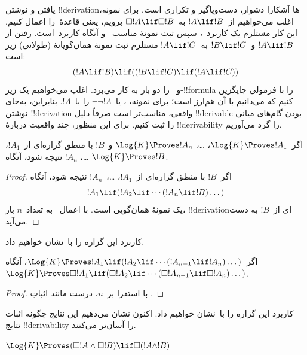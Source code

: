 \documentclass[../../../include/open-logic-section]{subfiles}
\begin{document}


یافتن و نوشتن !!{derivation}ها آشکارا دشوار، دست‌وپاگیر و تکراری است.
برای نمونه، اغلب می‌خواهیم از~$!A \lif !B$ به~$\Box !A \lif \Box !B$
برویم، یعنی قاعدهٔ~\RK را اعمال کنیم. این کار مستلزم یک کاربرد~\Nec،
سپس ثبت نمونهٔ مناسب~ و آنگاه کاربرد~\MP است. رفتن از
$!A \lif !B$ و~$!B \lif !C$ به~$!A \lif !C$ مستلزم ثبت نمونهٔ
همان‌گویانهٔ (طولانی) زیر است:
\[
(!A \lif !B) \lif ((!B \lif !C) \lif (!A \lif !C))
\]
و~\MP{} را دو بار به کار می‌برد. اغلب می‌خواهیم یک زیر-!!{formula} را
با فرمولی جایگزین کنیم که می‌دانیم با آن هم‌ارز است؛ برای نمونه،
، یا~$\lnot\lnot !A$ را با~$!A$.
بنابراین، به‌جای نوشتن !!{derivation} واقعی، مناسب‌تر است صرفاً دلیل
!!{derivable} بودن گام‌های میانی را ثبت کنیم. برای این منظور، چند واقعیت
دربارهٔ !!{derivability} را گرد می‌آوریم.

\begin{prop}
  اگر~$\Log{K} \Proves !A_1$، \dots، $\Log{K} \Proves !A_n$ و~$!B$
  با منطق گزاره‌ای از~$!A_1$، \dots، $!A_n$ نتیجه شود، آنگاه
  $\Log{K} \Proves !B$.
\end{prop}

\begin{proof}
  اگر~$!B$ با منطق گزاره‌ای از~$!A_1$، \dots،~$!A_n$ نتیجه شود، آنگاه
  \[
  !A_1 \lif (!A_2 \lif \cdots (!A_n \lif !B)\dots)
  \]
  یک نمونهٔ همان‌گویی است. با اعمال~\MP{} به تعداد~$n$ بار،
  !!{derivation}ای از~$!B$ به دست می‌آید.
\end{proof}

کاربرد این گزاره را با~\PL نشان خواهیم داد.

\begin{prop}
  اگر~$\Log{K} \Proves !A_1 \lif (!A_2 \lif \cdots (!A_{n-1} \lif
  !A_n)\dots)$، آنگاه~$\Log{K} \Proves \Box !A_1 \lif (\Box !A_2 \lif
  \cdots (\Box !A_{n-1} \lif \Box !A_n)\dots)$.
\end{prop}

\begin{proof}
  با استقرا بر~$n$، درست مانند اثباتِ .
\end{proof}

کاربرد این گزاره را با~\RK نشان خواهیم داد. اکنون نشان می‌دهیم این
نتایج چگونه اثبات نتایج !!{derivability} را آسان‌تر می‌کنند.

\begin{prop}
  $\Log{K} \Proves (\Box!A \land \Box!B) \lif \Box (!A \land !B)$
\end{prop}
\end{document}
